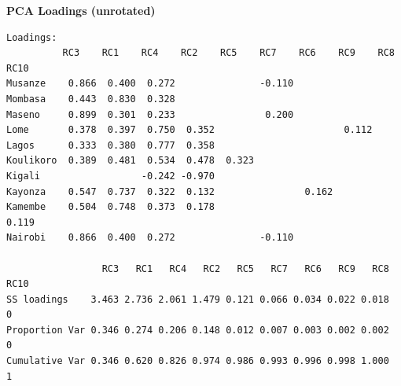 \documentclass[12pt,a4paper]{article}
\begin{document}
\textbf{PCA Loadings (unrotated)}
\begin{verbatim}
Loadings:
          RC3    RC1    RC4    RC2    RC5    RC7    RC6    RC9    RC8    RC10  
Musanze    0.866  0.400  0.272               -0.110                            
Mombasa    0.443  0.830  0.328                                                 
Maseno     0.899  0.301  0.233                0.200                            
Lome       0.378  0.397  0.750  0.352                       0.112              
Lagos      0.333  0.380  0.777  0.358                                          
Koulikoro  0.389  0.481  0.534  0.478  0.323                                   
Kigali                  -0.242 -0.970                                          
Kayonza    0.547  0.737  0.322  0.132                0.162                     
Kamembe    0.504  0.748  0.373  0.178                              0.119       
Nairobi    0.866  0.400  0.272               -0.110                            

                 RC3   RC1   RC4   RC2   RC5   RC7   RC6   RC9   RC8 RC10
SS loadings    3.463 2.736 2.061 1.479 0.121 0.066 0.034 0.022 0.018    0
Proportion Var 0.346 0.274 0.206 0.148 0.012 0.007 0.003 0.002 0.002    0
Cumulative Var 0.346 0.620 0.826 0.974 0.986 0.993 0.996 0.998 1.000    1
\end{verbatim}
\end{document}
